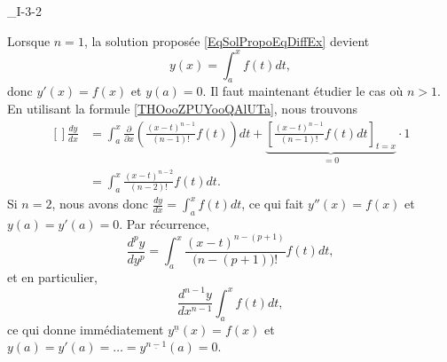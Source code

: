 

\begin{corrige}{_I-3-2}

	Lorsque $n=1$, la solution proposée \eqref{EqSolPropoEqDiffEx} devient
	\begin{equation}
		y(x)=\int_a^xf(t)dt,
	\end{equation}
	donc $y'(x)=f(x)$ et $y(a)=0$. Il faut maintenant étudier le cas où $n>1$. En utilisant la formule \eqref{THOooZPUYooQAlUTa}, nous trouvons
	\begin{equation}
		\begin{aligned}[]
			\frac{ dy }{ dx } & =	\int_a^x \frac{ \partial  }{ \partial x }\left( \frac{ (x-t)^{n-1} }{ (n-1)! }f(t)\right)dt+\underbrace{\left[   \frac{ (x-t)^{n-1} }{ (n-1)! }f(t)dt  \right]_{t=x}}_{=0}\cdot 1 \\
			                  & =\int_a^x\frac{ (x-t)^{n-2} }{ (n-2)! }f(t)dt.
		\end{aligned}
	\end{equation}
	Si $n=2$, nous avons donc $\frac{ dy }{ dx }=\int_a^xf(t)dt$, ce qui fait $y''(x)=f(x)$ et $y(a)=y'(a)=0$. Par récurrence,
	\begin{equation}
		\frac{ d^py }{ dy^p }=\int_a^x\frac{ (x-t)^{n-(p+1)} }{ \big( n-(p+1) \big)! }f(t)dt,
	\end{equation}
	et en particulier,
	\begin{equation}
		\frac{ d^{n-1}y }{ dx^{n-1} }\int_a^xf(t)dt,
	\end{equation}
	ce qui donne immédiatement $y^{\underline{n}}(x)=f(x)$ et $y(a)=y'(a)=\ldots=y^{\underline{n-1}}(a)=0$.

\end{corrige}
